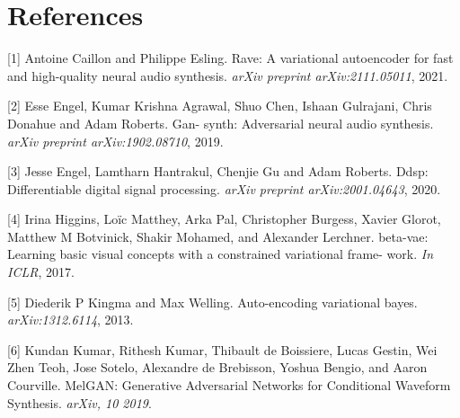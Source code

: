 \documentclass{article}
\begin{document}
\section*{References}



[1] Antoine Caillon and Philippe Esling.  Rave: A variational autoencoder for fast and high-quality neural audio synthesis. \textit{arXiv preprint arXiv:2111.05011}, 2021.


[2] Esse Engel, Kumar Krishna Agrawal, Shuo Chen, Ishaan Gulrajani, Chris Donahue and Adam Roberts. Gan- synth: Adversarial neural audio synthesis. \textit{arXiv preprint arXiv:1902.08710}, 2019.


[3] Jesse Engel, Lamtharn Hantrakul, Chenjie Gu and Adam Roberts. Ddsp: Differentiable digital signal processing. \textit{arXiv preprint arXiv:2001.04643}, 2020.

[4] Irina Higgins, Loïc Matthey, Arka Pal, Christopher Burgess, Xavier Glorot, Matthew M Botvinick, Shakir Mohamed, and Alexander Lerchner. beta-vae: Learning basic visual concepts with a constrained variational frame- work. \textit{In ICLR}, 2017.


[5] Diederik P Kingma and Max Welling. Auto-encoding variational bayes. \textit{arXiv:1312.6114}, 2013. 



[6] Kundan Kumar, Rithesh Kumar, Thibault de Boissiere, Lucas Gestin, Wei Zhen Teoh, Jose Sotelo, Alexandre de Brebisson, Yoshua Bengio, and Aaron Courville. MelGAN: Generative Adversarial Networks for Conditional Waveform Synthesis. \textit{arXiv, 10 2019}.




\end{document}
